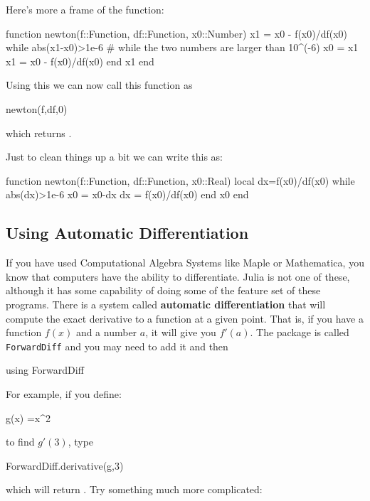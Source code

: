 Here's more a frame of the function: 
%
\begin{jlblock}[root]
function newton(f::Function, df::Function, x0::Number)
  x1 = x0 - f(x0)/df(x0)
  while abs(x1-x0)>1e-6 # while the two numbers are larger than 10^(-6)
	x0 = x1
    x1 = x0 - f(x0)/df(x0)	
  end
  x1
end
\end{jlblock}

Using this we can now call this function as
\begin{jlblock}[root]
newton(f,df,0)
\end{jlblock}
which returns \printpythontex[verb]. 



Just to clean things up a bit we can write this as:
%
\begin{jlblock}[root]
function newton(f::Function, df::Function, x0::Real)
  local dx=f(x0)/df(x0)
  while abs(dx)>1e-6
    x0 = x0-dx
    dx = f(x0)/df(x0)
  end
  x0  
end
\end{jlblock}




\subsection{Using Automatic Differentiation}

If you have used Computational Algebra Systems like Maple or
Mathematica, you know that computers have the ability to differentiate.
Julia is not one of these, although it has some capability of doing some
of the feature set of these programs. There is a system called
\textbf{automatic differentiation} that will compute the exact
derivative to a function at a given point. That is, if you have a
function $f(x)$ and a number $a$, it will give you $f'(a)$. The
package is called \texttt{ForwardDiff} and you may need to add it and
then

\begin{jlblock}[root]
using ForwardDiff
\end{jlblock}

For example, if you define:

\begin{jlblock}[root]
g(x) =x^2
\end{jlblock}

to find $g'(3)$, type
%
\begin{jlblock}[root]
ForwardDiff.derivative(g,3)
\end{jlblock}
%
which will return \printpythontex[verb]. Try something much more complicated:

